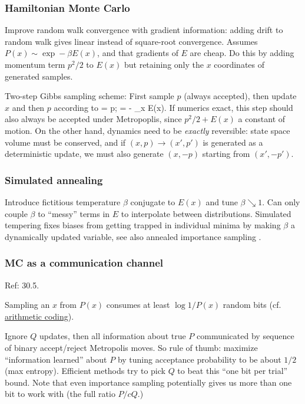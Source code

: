\documentclass[notitlepage,openany,11pt]{report}
\theoremstyle{plain}%
\numberwithin{equation}{section}
\begin{document}
\subsubsection{Hamiltonian Monte Carlo} Improve random walk convergence with gradient information: adding drift to random walk gives linear instead of square-root convergence. Assumes $P(x) \sim \exp -\beta E(x)$, and that gradients of $E$ are cheap. Do this by adding momentum term $p^{2}/2$ to $E(x)$ but retaining only the $x$ coordinates of generated samples. 

Two-step Gibbs sampling scheme: First sample $p$ (always accepted), then update $x$ and then $p$ according to
\be
{} = p; \qquad {} = - \partial_{x} E(x).
\ee
If numerics exact, this step should also always be accepted under Metropoplis, since $p^{2}/2 + E(x)$ a constant of motion.  On the other hand, dynamics need to be \textit{exactly} reversible: state space volume must be conserved, and if $(x,p) \to (x',p')$ is generated as a deterministic update, we must also generate $(x, -p)$ starting from $(x', -p')$.

\subsubsection{Simulated annealing} Introduce fictitious temperature $\beta$ conjugate to $E(x)$ and tune $\beta \searrow 1$. Can only couple $\beta$ to ``messy'' terms in $E$ to interpolate between distributions. Simulated tempering \cite{MarinariParisi:92} fixes biases from getting trapped in individual minima by making $\beta$ a dynamically updated variable, see also annealed importance sampling \cite{Neal:01}.

\subsubsection{MC as a communication channel} 

Ref: \cite{MacKay:03} 30.5.  

Sampling an $x$ from $P(x)$ consumes at least $\log 1/P(x)$ random bits (cf. \href{https://en.wikipedia.org/wiki/Arithmetic_coding}{arithmetic coding}). 

Ignore $Q$ updates, then all information about true $P$ communicated by sequence of binary accept/reject Metropolis moves. So rule of thumb: maximize ``information learned'' about $P$ by tuning acceptance probability to be about $1/2$ (max entropy). Efficient methods try to pick $Q$ to beat this ``one bit per trial'' bound. Note that even importance sampling potentially gives us more than one bit to work with (the full ratio $P/ cQ$.)
\end{document}
